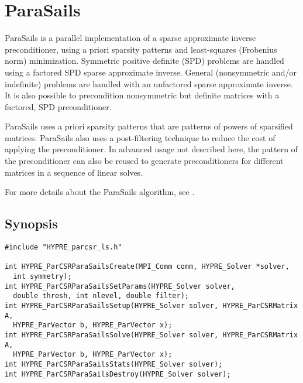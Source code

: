 \section{ParaSails}

ParaSails is a parallel implementation of a sparse approximate inverse
preconditioner, using a priori sparsity patterns and least-squares
(Frobenius norm) minimization.  Symmetric positive definite (SPD) problems
are handled using a factored SPD sparse approximate inverse.  General
(nonsymmetric and/or indefinite) problems are handled with an
unfactored sparse approximate inverse.  It is also possible to
precondition nonsymmetric but definite matrices with a factored, SPD
preconditioner.

ParaSails uses a priori sparsity patterns that are patterns of powers
of sparsified matrices.  ParaSails also uses a post-filtering technique
to reduce the cost of applying the preconditioner.  
In advanced usage not described here, the pattern of the
preconditioner can also be reused to generate preconditioners for different
matrices in a sequence of linear solves.

For more details about the ParaSails algorithm, see \cite{Chow:1999:APS}.

\subsection{Synopsis}

\begin{display}
\begin{verbatim}
#include "HYPRE_parcsr_ls.h"

int HYPRE_ParCSRParaSailsCreate(MPI_Comm comm, HYPRE_Solver *solver, 
  int symmetry);
int HYPRE_ParCSRParaSailsSetParams(HYPRE_Solver solver, 
  double thresh, int nlevel, double filter);
int HYPRE_ParCSRParaSailsSetup(HYPRE_Solver solver, HYPRE_ParCSRMatrix A,
  HYPRE_ParVector b, HYPRE_ParVector x);
int HYPRE_ParCSRParaSailsSolve(HYPRE_Solver solver, HYPRE_ParCSRMatrix A,
  HYPRE_ParVector b, HYPRE_ParVector x);
int HYPRE_ParCSRParaSailsStats(HYPRE_Solver solver);
int HYPRE_ParCSRParaSailsDestroy(HYPRE_Solver solver);
\end{verbatim}
\end{display}

